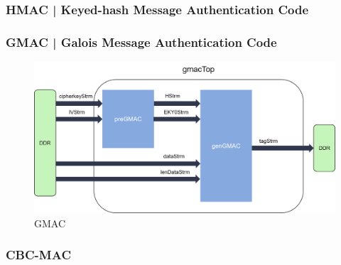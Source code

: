 \subsubsection{HMAC | Keyed-hash Message Authentication Code}



\textsf{\small }

\subsubsection{GMAC | Galois Message Authentication Code}


\textsf{\small }

\begin{figure}[H]
	\centering
	\includegraphics[width=.9\textwidth, height=.9\textheight, keepaspectratio]{./images/aes_modes/internal_structure_of_gmac} %
	\caption{GMAC}
	\label{fig:gmac}
\end{figure}

\subsubsection{CBC-MAC}


\textsf{\small }

